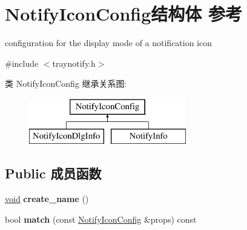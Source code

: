 \hypertarget{struct_notify_icon_config}{}\section{Notify\+Icon\+Config结构体 参考}
\label{struct_notify_icon_config}


configuration for the display mode of a notification icon  




{\ttfamily \#include $<$traynotify.\+h$>$}

类 Notify\+Icon\+Config 继承关系图\+:\begin{figure}[H]
\begin{center}
\leavevmode
\includegraphics[height=2.000000cm]{struct_notify_icon_config}
\end{center}
\end{figure}
\subsection*{Public 成员函数}
\begin{DoxyCompactItemize}
\item 
\mbox{\label{struct_notify_icon_config_a9319c2960eb7ba9e3965df0ff445f9ec}} 
\hyperlink{interfacevoid}{void} {\bfseries create\+\_\+name} ()
\item 
\mbox{\label{struct_notify_icon_config_a71f83b705018713fddc42e36ee23de9f}} 
bool {\bfseries match} (const \hyperlink{struct_notify_icon_config}{Notify\+Icon\+Config} \&props) const
\end{DoxyCompactItemize}
